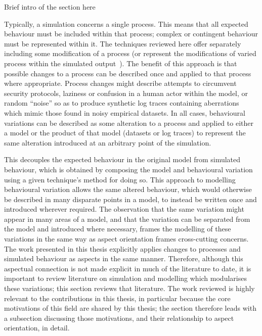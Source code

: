 
Brief intro of the section here~


Typically, a simulation concerns a single process. This means that all expected
behaviour must be included within that process; complex or contingent behaviour
must be represented within it. The techniques reviewed here offer separately
including some modification of a process (or represent the modifications of
varied process within the simulated
output~\cite{stocker2013secsy,stocker2014secsy}). The benefit of this approach
is that possible changes to a process can be described once and applied to that
process where appropriate. Process changes might describe attempts to circumvent
security protocols, laziness or confusion in a human actor within the model, or
random ``noise'' so as to produce synthetic log traces containing aberrations
which mimic those found in noisy empirical datasets. In all cases, behavioural
variations can be described as some alteration to a process and applied to
either a model or the product of that model (datasets or log traces) to
represent the same alteration introduced at an arbitrary point of the
simulation.

This decouples the expected behaviour in the original model from simulated
behaviour, which is obtained by composing the model and behavioural variation
using a given technique's method for doing so. This approach to modelling
behavioural variation allows the same altered behaviour, which would otherwise
be described in many disparate points in a model, to instead be written once and
introduced wherever required. The observation that the same variation might
appear in many areas of a model, and that the variation can be separated from
the model and introduced where necessary, frames the modelling of these
variations in the same way as aspect orientation frames cross-cutting concerns.
The work presented in this thesis explicitly applies changes to processes and
simulated behaviour as aspects in the same manner. Therefore, although this
aspectual connection is not made explicit in much of the literature to date, it
is important to review literature on simulation and modelling which modularises
these variations; this section reviews that literature. The work reviewed is
highly relevant to the contributions in this thesis, in particular because the
core motivations of this field are shared by this thesis; the section therefore
leads with a subsection discussing those motivations, and their relationship to
aspect orientation, in detail.


